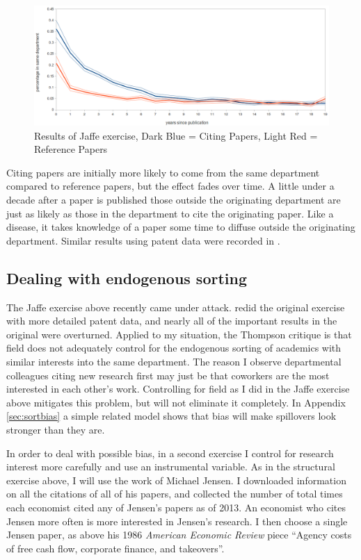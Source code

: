 \begin{figure}[!htbp]
\centering
\includegraphics[scale=0.35]{pics/jaf_results_pooled.png}
\caption{Results of Jaffe exercise, Dark Blue = Citing Papers, Light Red =
Reference Papers}
\label{fig:jaf_ex}
\end{figure}

Citing papers are initially more likely to come from the same department
compared to reference papers, but the effect fades over time. A little
under a decade after a paper is published those outside the originating
department are just as likely as those in the department to cite the
originating paper. Like a disease, it takes knowledge of a paper some
time to diffuse outside the originating department. Similar results
using patent data were recorded in \citet{jaffe1993geographic}.

\subsection{Dealing with endogenous sorting}

The Jaffe exercise above recently came under attack.
\citet{thompson2005patent} redid the original exercise with more
detailed patent data, and nearly all of the important results in the
original were overturned. Applied to my situation, the Thompson critique
is that field does not adequately control for the endogenous sorting of
academics with similar interests into the same department. The reason I
observe departmental colleagues citing new research first may just be
that coworkers are the most interested in each other's work. Controlling
for field as I did in the Jaffe exercise above mitigates this problem,
but will not eliminate it completely. In Appendix \ref{sec:sortbias} a simple
related model shows that bias will make spillovers look stronger than they are.

In order to deal with possible bias, in a second exercise I control for
research interest more carefully and use an instrumental variable.
As in the structural exercise above, I will use the work of Michael Jensen.
I downloaded information on all the
citations of all of his papers, and collected the number of total times
each economist cited any of Jensen's papers as of 2013. An economist who
cites Jensen more often is more interested in Jensen's research. I then
choose a single Jensen paper, as above his 1986 \emph{American Economic Review} piece
``Agency costs of free cash flow, corporate finance, and takeovers''.

